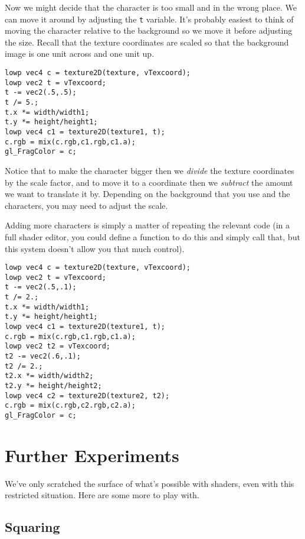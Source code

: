 \documentclass[
  html5,%
  mathml,%
  use filename%
]{internet}
\makeatletter
\let\prev@sec=\section
\renewcommand\section{\clearpage\prev@sec}
\makeatother
\begin{document}
Now we might decide that the character is too small and in the wrong place.
We can move it around by adjusting the \verb+t+ variable.
It's probably easiest to think of moving the character relative to the background so we move it before adjusting the size.
Recall that the texture coordinates are scaled so that the background image is one unit across and one unit up.

\begin{tcolorbox}
\begin{verbatim}
lowp vec4 c = texture2D(texture, vTexcoord);
lowp vec2 t = vTexcoord;
t -= vec2(.5,.5);
t /= 5.;
t.x *= width/width1;
t.y *= height/height1;
lowp vec4 c1 = texture2D(texture1, t);
c.rgb = mix(c.rgb,c1.rgb,c1.a);
gl_FragColor = c;
\end{verbatim}
\end{tcolorbox}

Notice that to make the character bigger then we \emph{divide} the texture coordinates by the scale factor, and to move it to a coordinate then we \emph{subtract} the amount we want to translate it by.
Depending on the background that you use and the characters, you may need to adjust the scale.

Adding more characters is simply a matter of repeating the relevant code (in a full shader editor, you could define a function to do this and simply call that, but this system doesn't allow you that much control).

\begin{tcolorbox}
\begin{verbatim}
lowp vec4 c = texture2D(texture, vTexcoord);
lowp vec2 t = vTexcoord;
t -= vec2(.5,.1);
t /= 2.;
t.x *= width/width1;
t.y *= height/height1;
lowp vec4 c1 = texture2D(texture1, t);
c.rgb = mix(c.rgb,c1.rgb,c1.a);
lowp vec2 t2 = vTexcoord;
t2 -= vec2(.6,.1);
t2 /= 2.;
t2.x *= width/width2;
t2.y *= height/height2;
lowp vec4 c2 = texture2D(texture2, t2);
c.rgb = mix(c.rgb,c2.rgb,c2.a);
gl_FragColor = c;
\end{verbatim}
\end{tcolorbox}


\section{Further Experiments}

We've only scratched the surface of what's possible with shaders, even with this restricted situation.
Here are some more to play with.

\subsection{Squaring}
\end{document}
